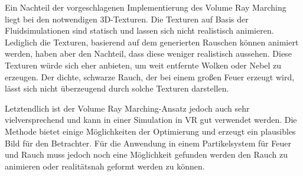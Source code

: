 Ein Nachteil der vorgeschlagenen Implementierung des Volume Ray Marching liegt bei den notwendigen 3D-Texturen. 
Die Texturen auf Basis der Fluidsimulationen sind statisch und lassen sich nicht realistisch animieren. Lediglich die Texturen, basierend auf dem
generierten Rauschen können animiert werden, haben aber den Nachteil, dass diese weniger realistisch aussehen. Diese Texturen würde sich eher anbieten,
um weit entfernte Wolken oder Nebel zu erzeugen. Der dichte, schwarze Rauch, der bei einem großen Feuer erzeugt wird, lässt sich nicht überzeugend 
durch solche Texturen darstellen. 

Letztendlich ist der Volume Ray Marching-Ansatz jedoch auch sehr vielversprechend und kann in einer Simulation in VR gut verwendet werden. 
Die Methode bietet einige Möglichkeiten der Optimierung und erzeugt ein plausibles Bild für den Betrachter. 
Für die Anwendung in einem Partikelsystem für Feuer und Rauch muss jedoch noch eine Möglichkeit gefunden werden den Rauch zu animieren oder 
realitätsnah geformt werden zu können. 



